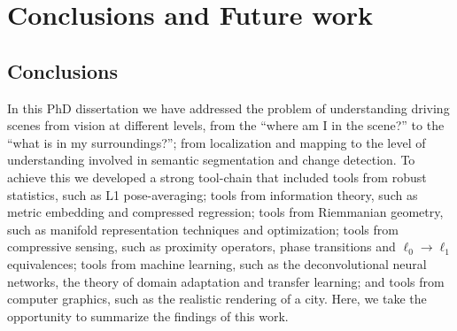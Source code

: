 
\chapter{Conclusions and Future work}
\label{chap:end}

\section{Conclusions}

In this PhD dissertation we have addressed the problem of understanding driving scenes from vision at different levels, from the ``where am I in the scene?'' to the ``what is in my surroundings?''; from localization and mapping to the level of understanding involved in semantic segmentation and change detection. To achieve this we developed a strong tool-chain that included tools from robust statistics, such as L1 pose-averaging; tools from information theory, such as metric embedding and compressed regression; tools from Riemmanian geometry, such as manifold representation techniques and optimization; tools from compressive sensing, such as proximity operators, phase transitions and $\ell_0 \rightarrow \ell_1$ equivalences; tools from machine learning, such as the deconvolutional neural networks, the theory of domain adaptation and transfer learning; and tools from computer graphics, such as the realistic rendering of a city. Here, we take the opportunity to summarize the findings of this work.

